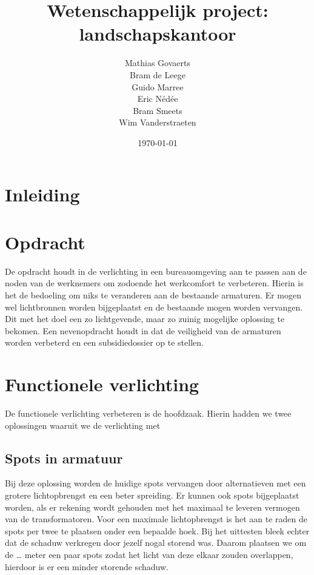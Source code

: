 \documentclass[a4paper,12pt]{article}
\begin{document}
	\title{Wetenschappelijk project: landschapskantoor}
	\author{Mathias Govaerts\\ Bram de Leege\\ Guido Marree\\ Eric N\'{e}d\'{e}e\\ Bram Smeets\\ Wim Vanderstraeten}
	\date{\today}	
	\maketitle
	
	\newpage
	\tableofcontents
	\newpage
	
	\section{Inleiding}
	
	\section{Opdracht}
	De opdracht houdt in de verlichting in een bureauomgeving aan te passen aan de noden van de werknemers om zodoende het werkcomfort te verbeteren. Hierin is het de bedoeling om niks te veranderen aan de bestaande armaturen. Er mogen wel lichtbronnen worden bijgeplaatst en de bestaande mogen worden vervangen. Dit met het doel een zo lichtgevende, maar zo zuinig mogelijke oplossing te bekomen. Een nevenopdracht houdt in dat de veiligheid van de armaturen worden verbeterd en een subsidiedossier op te stellen.
	
	\section{Functionele verlichting}
	De functionele verlichting verbeteren is de hoofdzaak. Hierin hadden we twee oplossingen waaruit we de verlichting met
	
	\subsection{Spots in armatuur}
	Bij deze oplossing worden de huidige spots vervangen door alternatieven met een grotere lichtopbrengst en een beter spreiding. Er kunnen ook spots bijgeplaatst worden, als er rekening wordt gehouden met het maximaal te leveren vermogen van de transformatoren. Voor een maximale lichtopbrengst is het aan te raden de spots per twee te plaatsen onder een bepaalde hoek. Bij het uittesten bleek echter dat de schaduw verkregen door jezelf nogal storend was. Daarom plaatsen we om de … meter een paar spots zodat het licht van deze elkaar zouden overlappen, hierdoor is er een minder storende schaduw.
	
\end{document}
